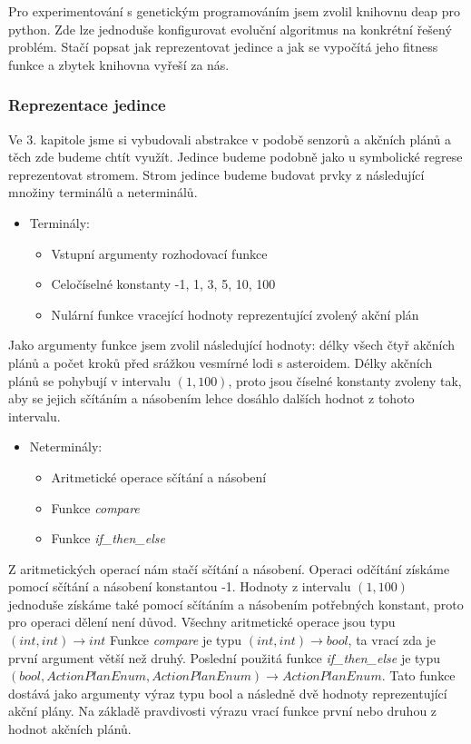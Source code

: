 Pro experimentování s genetickým programováním jsem zvolil knihovnu deap pro python. Zde lze jednoduše konfigurovat evoluční algoritmus na konkrétní řešený problém.
Stačí popsat jak reprezentovat jedince a jak se vypočítá jeho fitness funkce a zbytek knihovna vyřeší za nás.

\subsubsection{Reprezentace jedince}

Ve 3. kapitole jsme si vybudovali abstrakce v podobě senzorů a akčních plánů a těch zde budeme chtít využít.
Jedince budeme podobně jako u symbolické regrese reprezentovat stromem.
Strom jedince budeme budovat prvky z následující množiny terminálů a neterminálů.

\begin{itemize}
\item{
    Terminály:
    \begin{itemize}
        \item Vstupní argumenty rozhodovací funkce
        \item Celočíselné konstanty -1, 1, 3, 5, 10, 100
        \item Nulární funkce vracející hodnoty reprezentující zvolený akční plán  
    \end{itemize}    
    }    
\end{itemize}
Jako argumenty funkce jsem zvolil následující hodnoty: délky všech čtyř akčních plánů a počet kroků před srážkou vesmírné lodi s asteroidem.
    Délky akčních plánů se pohybují v intervalu $(1,100)$, proto jsou číselné konstanty zvoleny tak, aby se jejich sčítáním a násobením lehce dosáhlo dalších hodnot z tohoto intervalu.


\begin{itemize}

\item{
    Neterminály:
    \begin{itemize}
        \item Aritmetické operace sčítání a násobení
        \item Funkce \emph{compare}
        \item Funkce \emph{if\_then\_else}
    \end{itemize}
}
\end{itemize}
Z aritmetických operací nám stačí sčítání a násobení. Operaci odčítání získáme pomocí sčítání a násobení konstantou -1. 
Hodnoty z intervalu $(1,100)$ jednoduše získáme také pomocí sčítáním a násobením potřebných konstant, proto pro operaci dělení není důvod.
Všechny aritmetické operace jsou typu $(int, int) \rightarrow int$
Funkce \emph{compare} je typu $(int, int) \rightarrow bool$, ta vrací zda je první argument větší než druhý.
Poslední použitá funkce \emph{if\_then\_else} je typu 
\newline
$(bool, ActionPlanEnum, ActionPlanEnum)\rightarrow ActionPlanEnum$. 
Tato funkce dostává jako argumenty výraz typu bool a následně dvě hodnoty reprezentující akční plány. 
Na základě pravdivosti výrazu vrací funkce první nebo druhou z hodnot akčních plánů.


